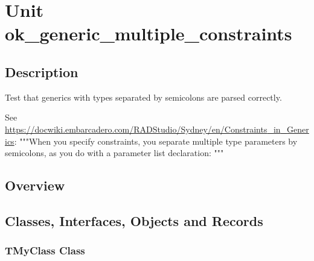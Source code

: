 \documentclass{report}
\newif\ifpdf
\begin{document}
\label{toc}\tableofcontents
\newpage
\newlength{\tmplength}
\chapter{Unit ok{\_}generic{\_}multiple{\_}constraints}
\label{ok_generic_multiple_constraints}
\section{Description}
Test that generics with types separated by semicolons are parsed correctly.\hfill\vspace*{1ex}

 See \href{https://docwiki.embarcadero.com/RADStudio/Sydney/en/Constraints_in_Generics}{https://docwiki.embarcadero.com/RADStudio/Sydney/en/Constraints{\_}in{\_}Generics}: """When you specify constraints, you separate multiple type parameters by semicolons, as you do with a parameter list declaration: """
\section{Overview}
\begin{description}
\item[\texttt{\begin{ttfamily}TMyClass\end{ttfamily} Class}]
\item[\texttt{\begin{ttfamily}TMyClassWithConstraints\end{ttfamily} Class}]
\item[\texttt{\begin{ttfamily}TMyClassWithConstraints2\end{ttfamily} Class}]
\end{description}
\section{Classes, Interfaces, Objects and Records}
\ifpdf
\subsection*{\large{\textbf{TMyClass Class}}\normalsize\hspace{1ex}\hrulefill}
\else
\subsection*{TMyClass Class}
\fi
\label{ok_generic_multiple_constraints.TMyClass}
\end{document}
